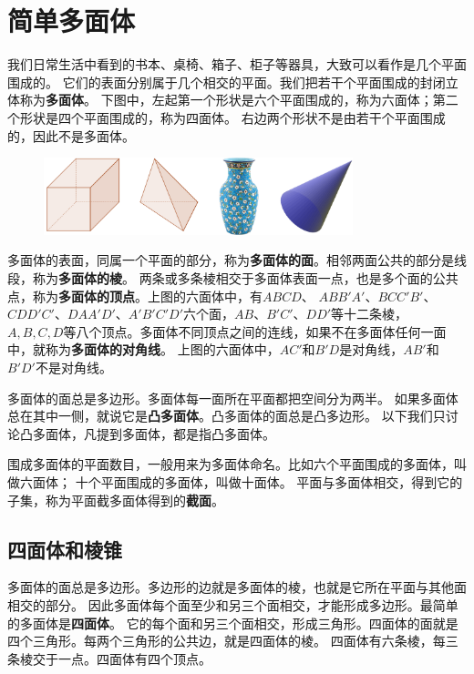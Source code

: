 \documentclass[12pt,UTF8]{ctexbook}
\begin{document}
\chapter{简单多面体}
我们日常生活中看到的书本、桌椅、箱子、柜子等器具，大致可以看作是几个平面围成的。
它们的表面分别属于几个相交的平面。我们把若干个平面围成的封闭立体称为\textbf{多面体}。
下图中，左起第一个形状是六个平面围成的，称为六面体；第二个形状是四个平面围成的，称为四面体。
右边两个形状不是由若干个平面围成的，因此不是多面体。

\begin{figure}[h] 
    \centering
    \includegraphics[width=0.8\textwidth]{多面体1.png}
\end{figure}

多面体的表面，同属一个平面的部分，称为\textbf{多面体的面}。相邻两面公共的部分是线段，称为\textbf{多面体的棱}。
两条或多条棱相交于多面体表面一点，也是多个面的公共点，称为\textbf{多面体的顶点}。上图的六面体中，有$ABCD$、
$ABB'A'$、$BCC'B'$、$CDD'C'$、$DAA'D'$、$A'B'C'D'$六个面，$AB$、$B'C'$、$DD'$等十二条棱，
$A,B,C,D$等八个顶点。多面体不同顶点之间的连线，如果不在多面体任何一面中，就称为\textbf{多面体的对角线}。
上图的六面体中，$AC'$和$B'D$是对角线，$AB'$和$B'D'$不是对角线。

多面体的面总是多边形。多面体每一面所在平面都把空间分为两半。
如果多面体总在其中一侧，就说它是\textbf{凸多面体}。凸多面体的面总是凸多边形。
以下我们只讨论凸多面体，凡提到多面体，都是指凸多面体。

围成多面体的平面数目，一般用来为多面体命名。比如六个平面围成的多面体，叫做六面体；
十个平面围成的多面体，叫做十面体。
平面与多面体相交，得到它的子集，称为平面截多面体得到的\textbf{截面}。

\section{四面体和棱锥}
多面体的面总是多边形。多边形的边就是多面体的棱，也就是它所在平面与其他面相交的部分。
因此多面体每个面至少和另三个面相交，才能形成多边形。最简单的多面体是\textbf{四面体}。
它的每个面和另三个面相交，形成三角形。四面体的面就是四个三角形。每两个三角形的公共边，就是四面体的棱。
四面体有六条棱，每三条棱交于一点。四面体有四个顶点。
\end{document}
